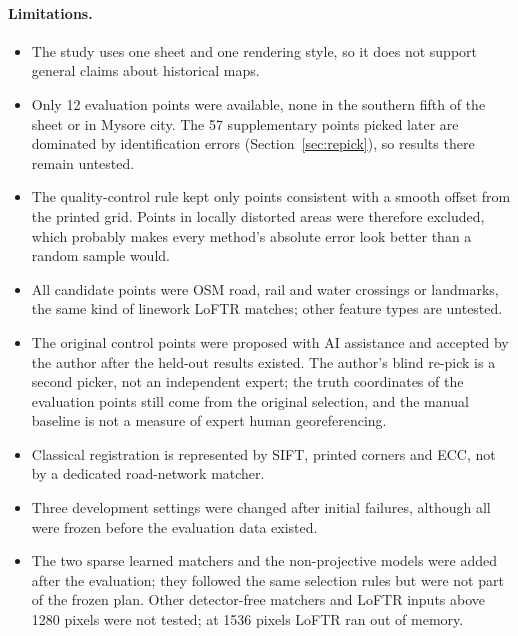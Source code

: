 \documentclass[10pt,twocolumn]{article}
\begin{document}
\paragraph{Limitations.}
\begin{itemize}
\item The study uses one sheet and one rendering style, so it does not support general claims about historical maps.
\item Only 12 evaluation points were available, none in the southern fifth of the sheet or in Mysore city. The 57 supplementary points picked later are dominated by identification errors (Section~\ref{sec:repick}), so results there remain untested.
\item The quality-control rule kept only points consistent with a smooth offset from the printed grid. Points in locally distorted areas were therefore excluded, which probably makes every method's absolute error look better than a random sample would.
\item All candidate points were OSM road, rail and water crossings or landmarks, the same kind of linework LoFTR matches; other feature types are untested.
\item The original control points were proposed with AI assistance and accepted by the author after the held-out results existed. The author's blind re-pick is a second picker, not an independent expert; the truth coordinates of the evaluation points still come from the original selection, and the manual baseline is not a measure of expert human georeferencing.
\item Classical registration is represented by SIFT, printed corners and ECC, not by a dedicated road-network matcher.
\item Three development settings were changed after initial failures, although all were frozen before the evaluation data existed.
\item The two sparse learned matchers and the non-projective models were added after the evaluation; they followed the same selection rules but were not part of the frozen plan. Other detector-free matchers and LoFTR inputs above 1280 pixels were not tested; at 1536 pixels LoFTR ran out of memory.
\end{itemize}
\end{document}
